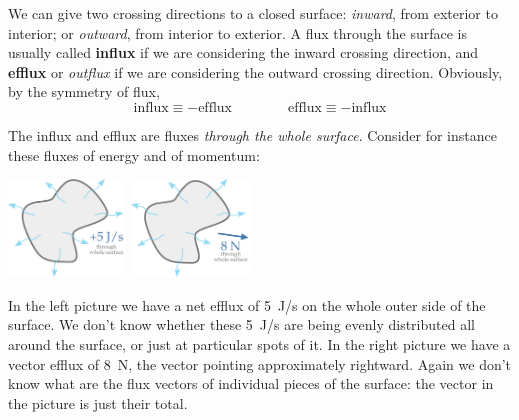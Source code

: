 \documentclass[a4paper,12pt,%
onecolumn,oneside,%
british%
]{memoir}
\renewcommand*{\|}[1][]{\nonscript\:#1\vert\nonscript\:\mathopen{}}
\begin{document}
We can give two crossing directions to a closed surface: \emph{inward}, from exterior to interior; or \emph{outward}, from interior to exterior. A flux through the surface is usually called \textbf{influx} if we are considering the inward crossing direction, and \textbf{efflux} or \emph{outflux} if we are considering the outward crossing direction. Obviously, by the symmetry of flux,
\begin{equation*}
  \text{influx} \equiv -\text{efflux}
  \qquad\qquad
  \text{efflux} \equiv -\text{influx}
\end{equation*}



The influx and efflux are fluxes \emph{through the whole surface}. Consider for instance these fluxes of energy and of momentum:
\begin{center}
  \hspace*{\fill}
  \includegraphics[align=c,height=7em]{images/efflux_J.pdf}
  \hfill
  \includegraphics[align=c,height=7em]{images/efflux_N.pdf}
  \hspace*{\fill}
\end{center}
In the left picture we have a net efflux of \qty{+5}{J/s} on the whole outer side of the surface. We don't know whether these \qty{5}{J/s} are being evenly distributed all around the surface, or just at particular spots of it. In the right picture we have a vector efflux of \qty{8}{N}, the vector pointing approximately rightward. Again we don't know what are the flux vectors of individual pieces of the surface: the vector in the picture is just their total.
\end{document}
